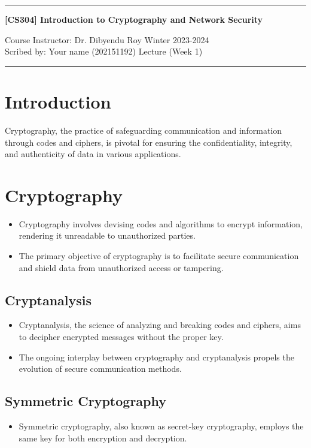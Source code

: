 \documentclass[11pt]{article}
\begin{document}
\noindent
\rule{\textwidth}{1pt}
\begin{center}
{\bf [CS304] Introduction to Cryptography and Network Security}
\end{center}
Course Instructor: Dr. Dibyendu Roy \hfill Winter 2023-2024\\
Scribed by: Your name (202151192) \hfill Lecture (Week 1)
\\
\rule{\textwidth}{1pt}
\section*{Introduction}
Cryptography, the practice of safeguarding communication and information through codes and ciphers, is pivotal for ensuring the confidentiality, integrity, and authenticity of data in various applications.

\section*{Cryptography}
\begin{itemize}
    \item Cryptography involves devising codes and algorithms to encrypt information, rendering it unreadable to unauthorized parties.
    \item The primary objective of cryptography is to facilitate secure communication and shield data from unauthorized access or tampering.
\end{itemize}

\subsection*{Cryptanalysis}
\begin{itemize}
    \item Cryptanalysis, the science of analyzing and breaking codes and ciphers, aims to decipher encrypted messages without the proper key.
    \item The ongoing interplay between cryptography and cryptanalysis propels the evolution of secure communication methods.
\end{itemize}

\subsection*{Symmetric Cryptography}
\begin{itemize}
    \item Symmetric cryptography, also known as secret-key cryptography, employs the same key for both encryption and decryption.
\end{itemize}
\end{document}
